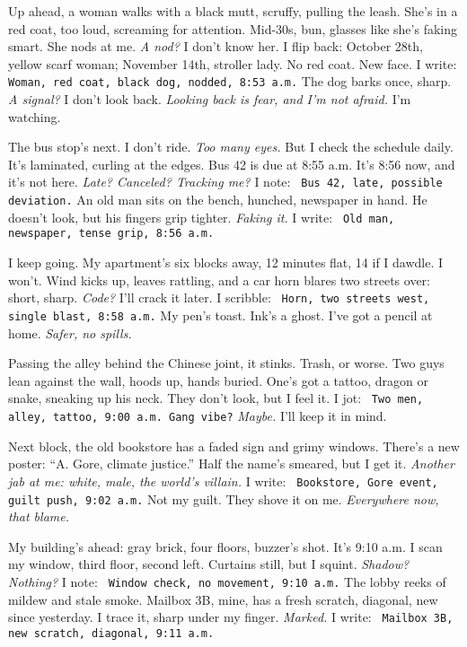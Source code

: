\documentclass[12pt]{article} %
\newcommand{\note}[1]{\texttt{\small \color{DarkGray} #1}}
\begin{document}
Up ahead, a woman walks with a black mutt, scruffy, pulling the leash. She’s in a red coat, too loud, screaming for attention. Mid-30s, bun, glasses like she’s faking smart. She nods at me. \textit{A nod?} I don’t know her. I flip back: October 28th, yellow scarf woman; November 14th, stroller lady. No red coat. New face. I write: \note{Woman, red coat, black dog, nodded, 8:53 a.m.} The dog barks once, sharp. \textit{A signal?} I don’t look back. \textit{Looking back is fear, and I’m not afraid.} I’m watching.

The bus stop’s next. I don’t ride. \textit{Too many eyes.} But I check the schedule daily. It’s laminated, curling at the edges. Bus 42 is due at 8:55 a.m. It’s 8:56 now, and it’s not here. \textit{Late? Canceled? Tracking me?} I note: \note{Bus 42, late, possible deviation.} An old man sits on the bench, hunched, newspaper in hand. He doesn’t look, but his fingers grip tighter. \textit{Faking it.} I write: \note{Old man, newspaper, tense grip, 8:56 a.m.}

I keep going. My apartment’s six blocks away, 12 minutes flat, 14 if I dawdle. I won’t. Wind kicks up, leaves rattling, and a car horn blares two streets over: short, sharp. \textit{Code?} I’ll crack it later. I scribble: \note{Horn, two streets west, single blast, 8:58 a.m.} My pen’s toast. Ink’s a ghost. I’ve got a pencil at home. \textit{Safer, no spills.}

Passing the alley behind the Chinese joint, it stinks. Trash, or worse. Two guys lean against the wall, hoods up, hands buried. One’s got a tattoo, dragon or snake, sneaking up his neck. They don’t look, but I feel it. I jot: \note{Two men, alley, tattoo, 9:00 a.m. Gang vibe?} \textit{Maybe.} I’ll keep it in mind.

Next block, the old bookstore has a faded sign and grimy windows. There’s a new poster: “\textnormal{A. Gore}, climate justice.” Half the name’s smeared, but I get it. \textit{Another jab at me: white, male, the world’s villain.} I write: \note{Bookstore, Gore event, guilt push, 9:02 a.m.} Not my guilt. They shove it on me. \textit{Everywhere now, that blame.}

My building’s ahead: gray brick, four floors, buzzer’s shot. It’s 9:10 a.m. I scan my window, third floor, second left. Curtains still, but I squint. \textit{Shadow? Nothing?} I note: \note{Window check, no movement, 9:10 a.m.} The lobby reeks of mildew and stale smoke. Mailbox 3B, mine, has a fresh scratch, diagonal, new since yesterday. I trace it, sharp under my finger. \textit{Marked.} I write: \note{Mailbox 3B, new scratch, diagonal, 9:11 a.m.}
\end{document}
